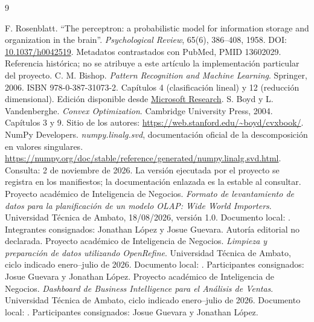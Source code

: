 \begin{thebibliography}{9}
 F. Rosenblatt. ``The perceptron: a probabilistic model for information storage and organization in the brain''. \emph{Psychological Review}, 65(6), 386--408, 1958. DOI: \href{https://doi.org/10.1037/h0042519}{10.1037/h0042519}. Metadatos contrastados con PubMed, PMID 13602029. Referencia histórica; no se atribuye a este artículo la implementación particular del proyecto.
 C. M. Bishop. \emph{Pattern Recognition and Machine Learning}. Springer, 2006. ISBN 978-0-387-31073-2. Capítulos 4 (clasificación lineal) y 12 (reducción dimensional). Edición disponible desde \href{https://www.microsoft.com/en-us/research/publication/pattern-recognition-machine-learning/}{Microsoft Research}.
 S. Boyd y L. Vandenberghe. \emph{Convex Optimization}. Cambridge University Press, 2004. Capítulos 3 y 9. Sitio de los autores: \url{https://web.stanford.edu/~boyd/cvxbook/}.
 NumPy Developers. \emph{numpy.linalg.svd}, documentación oficial de la descomposición en valores singulares. \url{https://numpy.org/doc/stable/reference/generated/numpy.linalg.svd.html}. Consulta: 2 de noviembre de 2026. La versión ejecutada por el proyecto se registra en los manifiestos; la documentación enlazada es la estable al consultar.
 Proyecto académico de Inteligencia de Negocios. \emph{Formato de levantamiento de datos para la planificación de un modelo OLAP: Wide World Importers}. Universidad Técnica de Ambato, 18/08/2026, versión 1.0. Documento local: . Integrantes consignados: Jonathan López y Josue Guevara. Autoría editorial no declarada.
 Proyecto académico de Inteligencia de Negocios. \emph{Limpieza y preparación de datos utilizando OpenRefine}. Universidad Técnica de Ambato, ciclo indicado enero--julio de 2026. Documento local: . Participantes consignados: Josue Guevara y Jonathan López.
 Proyecto académico de Inteligencia de Negocios. \emph{Dashboard de Business Intelligence para el Análisis de Ventas}. Universidad Técnica de Ambato, ciclo indicado enero--julio de 2026. Documento local: . Participantes consignados: Josue Guevara y Jonathan López.
\end{thebibliography}
